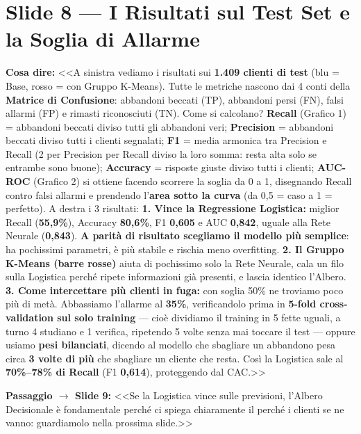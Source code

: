 \documentclass[10pt, a4paper]{article}
\newcommand{\say}[1]{%
  \par\vspace{2pt}\noindent\colorbox{SoftBox}{\parbox{\dimexpr\linewidth-2\fboxsep}{\raggedright\small\textbf{\color{PrimaryNavy}Cosa dire:} #1}}\par\vspace{2pt}%
}
\newcommand{\pass}[2]{%
  \par\vspace{1pt}\noindent\colorbox{PassBox}{\parbox{\dimexpr\linewidth-2\fboxsep}{\raggedright\footnotesize\textbf{\color{AccentAmber}Passaggio $\rightarrow$ Slide #1:} <<#2>>}}\par%
}
\newcommand{\slideblock}[3]{%
  \noindent\begin{minipage}{\linewidth}
    \section*{#1}
    \say{#2}
    #3
  \end{minipage}\par\vspace{6pt}%
}
\begin{document}
\slideblock{Slide 8 --- I Risultati sul Test Set e la Soglia di Allarme}{%
<<A sinistra vediamo i risultati sui \textbf{1.409 clienti di test} (blu = Base, rosso = con Gruppo K-Means). Tutte le metriche nascono dai 4 conti della \textbf{Matrice di Confusione}: abbandoni beccati (TP), abbandoni persi (FN), falsi allarmi (FP) e rimasti riconosciuti (TN). Come si calcolano? \textbf{Recall} (Grafico 1) = abbandoni beccati diviso tutti gli abbandoni veri; \textbf{Precision} = abbandoni beccati diviso tutti i clienti segnalati; \textbf{F1} = media armonica tra Precision e Recall (2 per Precision per Recall diviso la loro somma: resta alta solo se entrambe sono buone); \textbf{Accuracy} = risposte giuste diviso tutti i clienti; \textbf{AUC-ROC} (Grafico 2) si ottiene facendo scorrere la soglia da 0 a 1, disegnando Recall contro falsi allarmi e prendendo l'\textbf{area sotto la curva} (da 0,5 = caso a 1 = perfetto). A destra i 3 risultati:
\textbf{1. Vince la Regressione Logistica:} miglior Recall (\textbf{55,9\%}), Accuracy \textbf{80,6\%}, F1 \textbf{0,605} e AUC \textbf{0,842}, uguale alla Rete Neurale (\textbf{0,843}). \textbf{A parità di risultato scegliamo il modello più semplice}: ha pochissimi parametri, è più stabile e rischia meno overfitting.
\textbf{2. Il Gruppo K-Means (barre rosse)} aiuta di pochissimo solo la Rete Neurale, cala un filo sulla Logistica perché ripete informazioni già presenti, e lascia identico l'Albero.
\textbf{3. Come intercettare più clienti in fuga:} con soglia 50\% ne troviamo poco più di metà. Abbassiamo l'allarme al \textbf{35\%}, verificandolo prima in \textbf{5-fold cross-validation sul solo training} --- cioè dividiamo il training in 5 fette uguali, a turno 4 studiano e 1 verifica, ripetendo 5 volte senza mai toccare il test --- oppure usiamo \textbf{pesi bilanciati}, dicendo al modello che sbagliare un abbandono pesa circa \textbf{3 volte di più} che sbagliare un cliente che resta. Così la Logistica sale al \textbf{70\%--78\% di Recall} (F1 \textbf{0,614}), proteggendo dal CAC.>>%
}{\pass{9}{Se la Logistica vince sulle previsioni, l'Albero Decisionale è fondamentale perché ci spiega chiaramente il perché i clienti se ne vanno: guardiamolo nella prossima slide.}}
\end{document}
